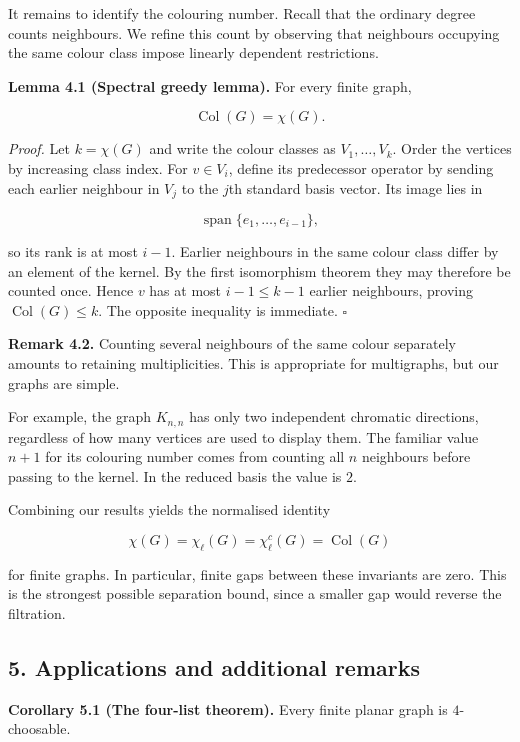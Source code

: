 \documentclass[11pt,letterpaper]{article}
\let\oldsubsection\subsection
\renewcommand{\subsection}{\Needspace{8\baselineskip}\oldsubsection}
\begin{document}
It remains to identify the colouring number. Recall that the ordinary degree counts neighbours. We refine this count by observing that neighbours occupying the same colour class impose linearly dependent restrictions.

\textbf{Lemma 4.1 (Spectral greedy lemma).} For every finite graph,

\[
\operatorname{Col}(G)=\chi(G).
\]

\emph{Proof.} Let \(k=\chi(G)\) and write the colour classes as \(V_1,\ldots,V_k\). Order the vertices by increasing class index. For \(v\in V_i\), define its predecessor operator by sending each earlier neighbour in \(V_j\) to the \(j\)th standard basis vector. Its image lies in

\[
\operatorname{span}\{e_1,\ldots,e_{i-1}\},
\]

so its rank is at most \(i-1\). Earlier neighbours in the same colour class differ by an element of the kernel. By the first isomorphism theorem they may therefore be counted once. Hence \(v\) has at most \(i-1\leq k-1\) earlier neighbours, proving \(\operatorname{Col}(G)\leq k\). The opposite inequality is immediate. \(\square\)

\textbf{Remark 4.2.} Counting several neighbours of the same colour separately amounts to retaining multiplicities. This is appropriate for multigraphs, but our graphs are simple.

For example, the graph \(K_{n,n}\) has only two independent chromatic directions, regardless of how many vertices are used to display them. The familiar value \(n+1\) for its colouring number comes from counting all \(n\) neighbours before passing to the kernel. In the reduced basis the value is \(2\).

Combining our results yields the normalised identity

\[
\chi(G)=\chi_\ell(G)=\chi^c_\ell(G)=\operatorname{Col}(G)
\]

for finite graphs. In particular, finite gaps between these invariants are zero. This is the strongest possible separation bound, since a smaller gap would reverse the filtration.

\subsection{5. Applications and additional remarks}\label{applications-and-additional-remarks}

\textbf{Corollary 5.1 (The four-list theorem).} Every finite planar graph is \(4\)-choosable.
\end{document}
